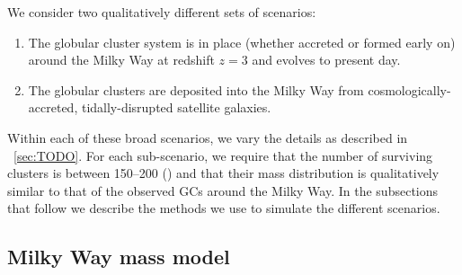 \documentclass[manuscript, letterpaper]{aastex6}
\begin{document}
We consider two qualitatively different sets of scenarios:
\begin{enumerate}
  \item The globular cluster system is in place (whether accreted or formed
    early on) around the Milky Way at redshift $z=3$ and evolves to present day.
  \item The globular clusters are deposited into the Milky Way from
    cosmologically-accreted, tidally-disrupted satellite galaxies.
\end{enumerate}
Within each of these broad scenarios, we vary the details as described in
\sectionname~\ref{sec:TODO}.
For each sub-scenario, we require that the number of surviving clusters is
between 150--200 () and that their mass distribution is
qualitatively similar to that of the observed GCs around the Milky Way.
In the subsections that follow we describe the methods we use to simulate the
different scenarios.



\subsection{Milky Way mass model} \label{sec:massmodel}
\end{document}
